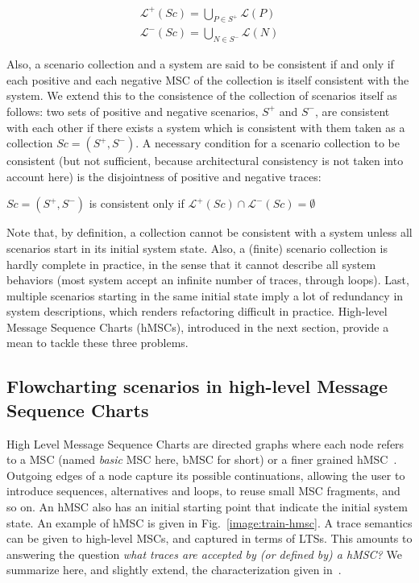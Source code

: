 \begin{align*}
\mathcal{L}^+(Sc) = \bigcup_{P \in S^+} \mathcal{L}(P) \\
\mathcal{L}^-(Sc) = \bigcup_{N \in S^-} \mathcal{L}(N)
\end{align*}

Also, a scenario collection and a system are said to be consistent if and only if each positive and each negative MSC of the collection is itself consistent with the system. We extend this to the consistence of the collection of scenarios itself as follows: two sets of positive and negative scenarios, $S^+$ and $S^-$, are consistent with each other if there exists a system which is consistent with them taken as a collection $Sc = (S^+,S^-)$. A necessary condition for a scenario collection to be consistent (but not sufficient, because architectural consistency is not taken into account here) is the disjointness of positive and negative traces:

\begin{center}
$Sc = (S^+,S^-)$ is consistent only if $\mathcal{L}^+(Sc) \cap \mathcal{L}^-(Sc) = \emptyset$
\end{center}

Note that, by definition, a collection cannot be consistent with a system unless all scenarios start in its initial system state. Also, a (finite) scenario collection is hardly complete in practice, in the sense that it cannot describe all system behaviors (most system accept an infinite number of traces, through loops). Last, multiple scenarios starting in the same initial state imply a lot of redundancy in system descriptions, which renders refactoring difficult in practice. High-level Message Sequence Charts (hMSCs), introduced in the next section, provide a mean to tackle these three problems.

\subsection[Flowcharting scenarios in high-level MSCs]{Flowcharting scenarios in high-level Message Sequence Charts\label{section:background-hmsc}}

High Level Message Sequence Charts are directed graphs where each node refers to a MSC (named \emph{basic} MSC here, bMSC for short) or a finer grained hMSC~\cite{ITU:1996}. Outgoing edges of a node capture its possible continuations, allowing the user to introduce sequences, alternatives and loops, to reuse small MSC fragments, and so on. An hMSC also has an initial starting point that indicate the initial system state. An example of hMSC is given in Fig.~\ref{image:train-hmsc}. A trace semantics can be given to high-level MSCs, and captured in terms of LTSs. This amounts to answering the question \emph{what traces are accepted by (or defined by) a hMSC?} We summarize here, and slightly extend, the characterization given in~\cite{Uchitel:2004}.


